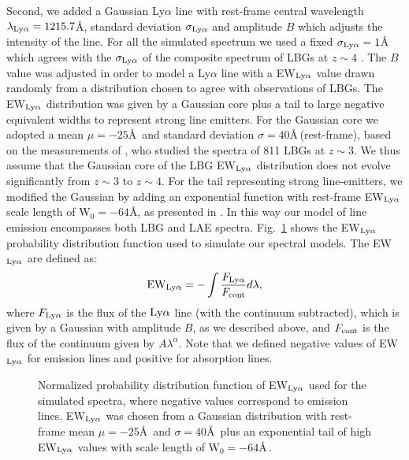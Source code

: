 \documentclass[iop, revtex4]{emulateapj}
\begin{document}
Second, we added a Gaussian Ly$\alpha$ line with rest-frame central
wavelength $\lambda_{\rm Ly\alpha}=1215.7$\AA, standard deviation
$\sigma_{\rm Ly\alpha}$ and amplitude $B$ which adjusts the intensity
of the line. For all the simulated spectrum we used a fixed
$\sigma_{\rm Ly\alpha}=1$\AA\, which agrees with the $\sigma_{\rm
  Ly\alpha}$ of the composite spectrum of LBGs at $z\sim4$
\citep{Jones12}. The $B$ value was adjusted in order to model a
Ly$\alpha$ line with a EW$_{\rm Ly\alpha}$ value drawn randomly from a
distribution chosen to agree with observations of LBGs. The
EW$_{\rm Ly\alpha}$ distribution was given by a Gaussian core
plus a tail to large negative equivalent widths to represent
strong line emitters.  For the Gaussian core
we adopted a mean $\mu=-25$\AA\, and standard deviation
$\sigma=40$\AA\,(rest-frame), based on the measurements
of \citet{Shapley03}, who studied the
spectra of 811
LBGs at $z\sim3$. We thus assume that the Gaussian core of the LBG EW$_{\rm
  Ly\alpha}$ distribution does not evolve significantly from
$z\sim3$ to $z\sim4$. For the tail representing strong line-emitters, we
modified the Gaussian by adding an exponential function
with rest-frame EW$_{\rm Ly\alpha}$ scale length of W$_{0}=-64$\AA, as presented in
\citet{Ciardullo12}.
In this way our model of line emission encompasses both LBG and LAE spectra.
Fig.~\ref{fig:ew_dist} shows the
EW$_{\rm Ly\alpha}$ probability distribution function used to simulate our spectral models. The EW$_{\rm Ly\alpha}$ are defined as: 
\begin{equation}
{\rm EW}_{\rm Ly\alpha} = - \int \frac{F_{\rm Ly\alpha}}{F_{\rm cont}} d\lambda, 
\label{eq:ew}
\end{equation}
where $F_{\rm Ly\alpha}$ is the flux of the ${\rm Ly\alpha}$ line
(with the continuum subtracted), which is given by a Gaussian with amplitude $B$, as we described above, and $F_{\rm cont}$ is the flux of the
continuum given by $A \lambda^{\alpha}$.
Note that we defined negative values of
EW$_{\rm Ly\alpha}$ for emission lines and positive for absorption
lines.

\begin{figure}
\caption{Normalized probability distribution function of EW$_{\rm Ly\alpha}$ used for the simulated spectra, where negative values correspond to emission lines. EW$_{\rm Ly\alpha}$ was chosen from a Gaussian distribution with rest-frame mean $\mu=-25$\AA\, and $\sigma=40$\AA\, \citep{Shapley03} plus an exponential tail of high EW$_{\rm Ly\alpha}$ values with scale length of W$_{0}=-64$\AA\,\citep{Ciardullo12}.\\} 
\label{fig:ew_dist}
\end{figure}
\end{document}

